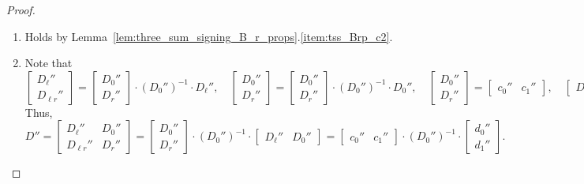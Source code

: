 \begin{proof}
    \begin{enumerate}
        \item Holds by Lemma~\ref{lem:three_sum_signing_B_r_props}.\ref{item:tss_Brp_c2}.

        \item Note that
        \[
            \begin{bmatrix} D_{\ell}'' \\ D_{\ell r}'' \end{bmatrix} = \begin{bmatrix} D_{0}'' \\ D_{r}'' \end{bmatrix} \cdot (D_{0}'')^{-1} \cdot D_{\ell}'', \quad
            \begin{bmatrix} D_{0}'' \\ D_{r}'' \end{bmatrix} = \begin{bmatrix} D_{0}'' \\ D_{r}'' \end{bmatrix} \cdot (D_{0}'')^{-1} \cdot D_{0}'', \quad
            \begin{bmatrix} D_{0}'' \\ D_{r}'' \end{bmatrix} = \begin{bmatrix} c_{0}'' & c_{1}'' \end{bmatrix}, \quad
            \begin{bmatrix} D_{\ell}'' & D_{0}'' \end{bmatrix} = \begin{bmatrix} d_{0}'' \\ d_{1}'' \end{bmatrix}.
        \]
        Thus,
        \[
            D''
            = \begin{bmatrix} D_{\ell}'' & D_{0}'' \\ D_{\ell r}'' & D_{r}'' \end{bmatrix}
            = \begin{bmatrix} D_{0}'' \\ D_{r}'' \end{bmatrix} \cdot (D_{0}'')^{-1} \cdot \begin{bmatrix} D_{\ell}'' & D_{0}'' \end{bmatrix}
            = \begin{bmatrix} c_{0}'' & c_{1}'' \end{bmatrix} \cdot (D_{0}'')^{-1} \cdot \begin{bmatrix} d_{0}'' \\ d_{1}'' \end{bmatrix}.
\]
\end{enumerate}
\end{proof}

